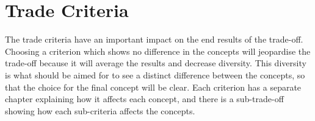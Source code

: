 



\section{Trade Criteria}
\label{sec:comp_trad_crit}

The trade criteria have an important impact on the end results of the trade-off. Choosing a criterion which shows no difference in the concepts will jeopardise the trade-off because it will average the results and decrease diversity. This diversity is what should be aimed for to see a distinct difference between the concepts, so that the choice for the final concept will be clear. Each criterion has a separate chapter explaining how it affects each concept, and there is a sub-trade-off showing how each sub-criteria affects the concepts. 

